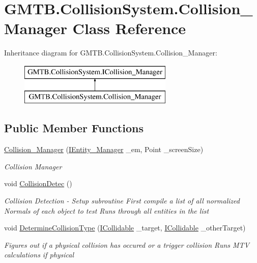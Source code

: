 \hypertarget{class_g_m_t_b_1_1_collision_system_1_1_collision___manager}{}\section{G\+M\+T\+B.\+Collision\+System.\+Collision\+\_\+\+Manager Class Reference}
\label{class_g_m_t_b_1_1_collision_system_1_1_collision___manager}
Inheritance diagram for G\+M\+T\+B.\+Collision\+System.\+Collision\+\_\+\+Manager\+:\begin{figure}[H]
\begin{center}
\leavevmode
\includegraphics[height=2.000000cm]{class_g_m_t_b_1_1_collision_system_1_1_collision___manager}
\end{center}
\end{figure}
\subsection*{Public Member Functions}
\begin{DoxyCompactItemize}
\item 
\mbox{\hyperlink{class_g_m_t_b_1_1_collision_system_1_1_collision___manager_aaaf93f4dcb6c695477622b09ed6f559a}{Collision\+\_\+\+Manager}} (\mbox{\hyperlink{interface_g_m_t_b_1_1_interfaces_1_1_i_entity___manager}{I\+Entity\+\_\+\+Manager}} \+\_\+em, Point \+\_\+screen\+Size)
\begin{DoxyCompactList}\small\item\em Collision Manager \end{DoxyCompactList}\item 
void \mbox{\hyperlink{class_g_m_t_b_1_1_collision_system_1_1_collision___manager_ad8099362db997b483df87f5f168f3bce}{Collision\+Detec}} ()
\begin{DoxyCompactList}\small\item\em Collision Detection -\/ Setup subroutine First compile a list of all normalized Normals of each object to test Runs through all entities in the list \end{DoxyCompactList}\item 
void \mbox{\hyperlink{class_g_m_t_b_1_1_collision_system_1_1_collision___manager_a04b8c27025aeb3d32f12e23dc294f607}{Determine\+Collision\+Type}} (\mbox{\hyperlink{interface_g_m_t_b_1_1_collision_system_1_1_i_collidable}{I\+Collidable}} \+\_\+target, \mbox{\hyperlink{interface_g_m_t_b_1_1_collision_system_1_1_i_collidable}{I\+Collidable}} \+\_\+other\+Target)
\begin{DoxyCompactList}\small\item\em Figures out if a physical collision has occured or a trigger collision Runs M\+TV calculations if physical \end{DoxyCompactList}\end{DoxyCompactItemize}


